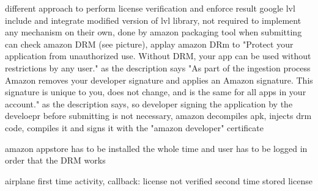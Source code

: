 %
different approach to perform license verification and enforce result
google lvl include and integrate modified version of lvl library, not required to implement any mechanism on their own, done by amazon packaging tool
when submitting can check amazon DRM (see picture), applay amazon DRm to "Protect your application from unauthorized use. Without DRM, your app can be used without restrictions by any user." as the description says
"As part of the ingestion process Amazon removes your developer signature and applies an Amazon signature. This signature is unique to you, does not change, and is the same for all apps in your account."  as the description says, so developer signing the application by the develoepr before submitting is not necessary, amazon decompiles apk, injects drm code, compiles it and signs it with the "amazon developer" certificate
\cite{munteanLicense}
%




amazon appstore has to be installed the whole time and user has to be logged in order that the DRM works

airplane
first time
activity, callback: license not verified
second time
stored license
